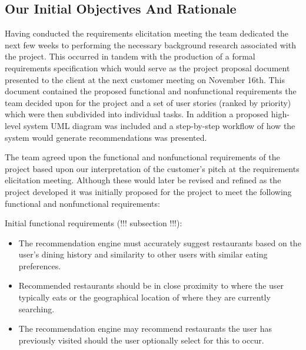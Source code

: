 \documentclass{l3proj}
\begin{document}
\subsection{Our Initial Objectives And Rationale}
\label{ourinitobjectives}






Having conducted the requirements elicitation meeting the team dedicated the next few weeks to performing the necessary background research associated with the project. This occurred in tandem with the production of a formal requirements specification which would serve as the project proposal document presented to the client at the next customer meeting on November 16th. This document contained the proposed functional and nonfunctional requirements the team decided upon for the project and a set of user stories (ranked by priority) which were then subdivided into individual tasks. In addition a proposed high-level system UML diagram was included and a step-by-step workflow of how the system would generate recommendations was presented.

The team agreed upon the functional and nonfunctional requirements of the project based upon our interpretation of the customer’s pitch at the requirements elicitation meeting. Although these would later be revised and refined as the project developed it was initially proposed for the project to meet the following functional and nonfunctional requirements:

Initial functional requirements (!!! subsection !!!):
\begin{itemize}
\item The recommendation engine must accurately suggest restaurants based on the user’s dining history and similarity to other users with similar eating preferences.
\item Recommended restaurants should be in close proximity to where the user typically eats or the geographical location of where they are currently searching.
\item The recommendation engine may recommend restaurants the user has previously visited should the user optionally select for this to occur.
\end{itemize}
\end{document}

